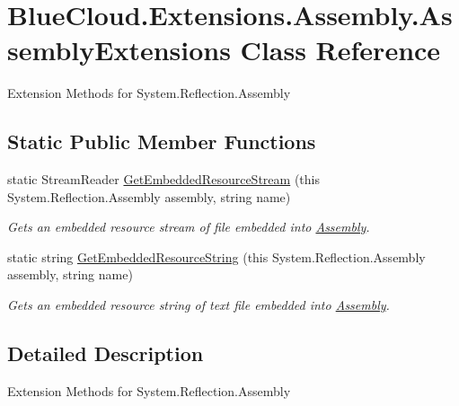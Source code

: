 \hypertarget{class_blue_cloud_1_1_extensions_1_1_assembly_1_1_assembly_extensions}{}\section{Blue\+Cloud.\+Extensions.\+Assembly.\+Assembly\+Extensions Class Reference}
\label{class_blue_cloud_1_1_extensions_1_1_assembly_1_1_assembly_extensions}


Extension Methods for System.\+Reflection.\+Assembly  


\subsection*{Static Public Member Functions}
\begin{DoxyCompactItemize}
\item 
static Stream\+Reader \mbox{\hyperlink{class_blue_cloud_1_1_extensions_1_1_assembly_1_1_assembly_extensions_a12cfb835d85cc28a85e5eb6e79dfedca}{Get\+Embedded\+Resource\+Stream}} (this System.\+Reflection.\+Assembly assembly, string name)
\begin{DoxyCompactList}\small\item\em Gets an embedded resource stream of file embedded into \mbox{\hyperlink{namespace_blue_cloud_1_1_extensions_1_1_assembly}{Assembly}}. \end{DoxyCompactList}\item 
static string \mbox{\hyperlink{class_blue_cloud_1_1_extensions_1_1_assembly_1_1_assembly_extensions_a9c884486d2566a849145d9eb563eca05}{Get\+Embedded\+Resource\+String}} (this System.\+Reflection.\+Assembly assembly, string name)
\begin{DoxyCompactList}\small\item\em Gets an embedded resource string of text file embedded into \mbox{\hyperlink{namespace_blue_cloud_1_1_extensions_1_1_assembly}{Assembly}}. \end{DoxyCompactList}\end{DoxyCompactItemize}


\subsection{Detailed Description}
Extension Methods for System.\+Reflection.\+Assembly 



